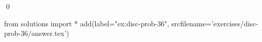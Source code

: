 
\begin{ex} 
  \label{ex:disc-prob-36}
  
  \qed
\end{ex} 
\begin{python0}
from solutions import *
add(label="ex:disc-prob-36",
    srcfilename='exercises/disc-prob-36/answer.tex') 
\end{python0}
